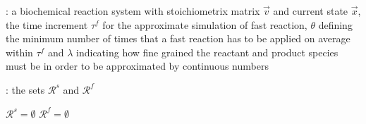 \begin{algorithm}[H]
\DontPrintSemicolon
{}

\caption{\protect\TitleFunction{}}
\label{algo:two-class-reaction-partitioning}

\Input: a biochemical reaction system with stoichiometrix matrix $\vec{v}$ and current state $\vec{x}$, the time increment $\tau^f$ for the approximate simulation of fast reaction, $\theta$ defining the minimum number of times that a fast reaction has to be applied on average within $\tau^f$ and $\lambda$ indicating how fine grained the reactant and product species must be in order to be approximated by continuous numbers\;

\Output: the sets $\mathcal{R}^s$ and $\mathcal{R}^f$\;

$\mathcal{R}^s = \emptyset$\;
$\mathcal{R}^f = \emptyset$\;

\end{algorithm}

